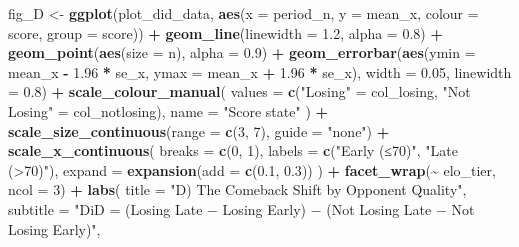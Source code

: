 \documentclass[
]{article}
\newenvironment{Shaded}{\begin{snugshade}}{\end{snugshade}}
\newcommand{\AttributeTok}[1]{\textcolor[rgb]{0.13,0.29,0.53}{#1}}
\newcommand{\DecValTok}[1]{\textcolor[rgb]{0.00,0.00,0.81}{#1}}
\newcommand{\FloatTok}[1]{\textcolor[rgb]{0.00,0.00,0.81}{#1}}
\newcommand{\FunctionTok}[1]{\textcolor[rgb]{0.13,0.29,0.53}{\textbf{#1}}}
\newcommand{\NormalTok}[1]{#1}
\newcommand{\OtherTok}[1]{\textcolor[rgb]{0.56,0.35,0.01}{#1}}
\newcommand{\SpecialCharTok}[1]{\textcolor[rgb]{0.81,0.36,0.00}{\textbf{#1}}}
\newcommand{\StringTok}[1]{\textcolor[rgb]{0.31,0.60,0.02}{#1}}
\begin{document}
\begin{Shaded}
\begin{Highlighting}[]
\NormalTok{fig\_D }\OtherTok{\textless{}{-}} \FunctionTok{ggplot}\NormalTok{(plot\_did\_data,}
                \FunctionTok{aes}\NormalTok{(}\AttributeTok{x =}\NormalTok{ period\_n, }\AttributeTok{y =}\NormalTok{ mean\_x, }\AttributeTok{colour =}\NormalTok{ score, }\AttributeTok{group =}\NormalTok{ score)) }\SpecialCharTok{+}
  \FunctionTok{geom\_line}\NormalTok{(}\AttributeTok{linewidth =} \FloatTok{1.2}\NormalTok{, }\AttributeTok{alpha =} \FloatTok{0.8}\NormalTok{) }\SpecialCharTok{+}
  \FunctionTok{geom\_point}\NormalTok{(}\FunctionTok{aes}\NormalTok{(}\AttributeTok{size =}\NormalTok{ n), }\AttributeTok{alpha =} \FloatTok{0.9}\NormalTok{) }\SpecialCharTok{+}
  \FunctionTok{geom\_errorbar}\NormalTok{(}\FunctionTok{aes}\NormalTok{(}\AttributeTok{ymin =}\NormalTok{ mean\_x }\SpecialCharTok{{-}} \FloatTok{1.96} \SpecialCharTok{*}\NormalTok{ se\_x,}
                    \AttributeTok{ymax =}\NormalTok{ mean\_x }\SpecialCharTok{+} \FloatTok{1.96} \SpecialCharTok{*}\NormalTok{ se\_x),}
                \AttributeTok{width =} \FloatTok{0.05}\NormalTok{, }\AttributeTok{linewidth =} \FloatTok{0.8}\NormalTok{) }\SpecialCharTok{+}
  \FunctionTok{scale\_colour\_manual}\NormalTok{(}
    \AttributeTok{values =} \FunctionTok{c}\NormalTok{(}\StringTok{"Losing"} \OtherTok{=}\NormalTok{ col\_losing, }\StringTok{"Not Losing"} \OtherTok{=}\NormalTok{ col\_notlosing),}
    \AttributeTok{name   =} \StringTok{"Score state"}
\NormalTok{  ) }\SpecialCharTok{+}
  \FunctionTok{scale\_size\_continuous}\NormalTok{(}\AttributeTok{range =} \FunctionTok{c}\NormalTok{(}\DecValTok{3}\NormalTok{, }\DecValTok{7}\NormalTok{), }\AttributeTok{guide =} \StringTok{"none"}\NormalTok{) }\SpecialCharTok{+}
  \FunctionTok{scale\_x\_continuous}\NormalTok{(}
    \AttributeTok{breaks =} \FunctionTok{c}\NormalTok{(}\DecValTok{0}\NormalTok{, }\DecValTok{1}\NormalTok{),}
    \AttributeTok{labels =} \FunctionTok{c}\NormalTok{(}\StringTok{"Early (≤70\textquotesingle{})"}\NormalTok{, }\StringTok{"Late (\textgreater{}70\textquotesingle{})"}\NormalTok{),}
    \AttributeTok{expand =} \FunctionTok{expansion}\NormalTok{(}\AttributeTok{add =} \FunctionTok{c}\NormalTok{(}\FloatTok{0.1}\NormalTok{, }\FloatTok{0.3}\NormalTok{))}
\NormalTok{  ) }\SpecialCharTok{+}
  \FunctionTok{facet\_wrap}\NormalTok{(}\SpecialCharTok{\textasciitilde{}}\NormalTok{ elo\_tier, }\AttributeTok{ncol =} \DecValTok{3}\NormalTok{) }\SpecialCharTok{+}
  \FunctionTok{labs}\NormalTok{(}
    \AttributeTok{title    =} \StringTok{"D) The Comeback Shift by Opponent Quality"}\NormalTok{,}
    \AttributeTok{subtitle =} \StringTok{"DiD = (Losing Late − Losing Early) − (Not Losing Late − Not Losing Early)"}\NormalTok{,}

\end{Highlighting}
\end{Shaded}
\end{document}
